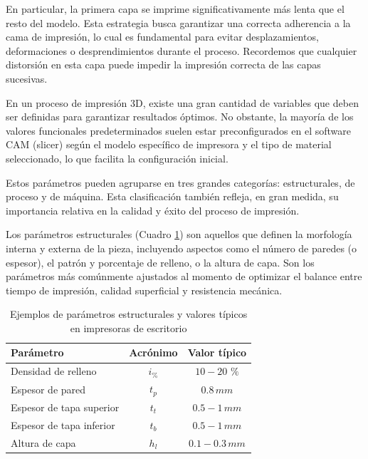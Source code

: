 En particular, la primera capa se imprime significativamente más lenta que el resto del modelo. Esta estrategia busca garantizar una correcta adherencia a la cama de impresión, lo cual es fundamental para evitar desplazamientos, deformaciones o desprendimientos durante el proceso. Recordemos que cualquier distorsión en esta capa puede impedir la impresión correcta de las capas sucesivas.

En un proceso de impresión 3D, existe una gran cantidad de variables que deben ser definidas para garantizar resultados óptimos. No obstante, la mayoría de los valores funcionales predeterminados suelen estar preconfigurados en el software CAM (slicer) según el modelo específico de impresora y el tipo de material seleccionado, lo que facilita la configuración inicial.

Estos parámetros pueden agruparse en tres grandes categorías: estructurales, de proceso y de máquina. Esta clasificación también refleja, en gran medida, su importancia relativa en la calidad y éxito del proceso de impresión. 

Los parámetros estructurales (Cuadro \ref{tab:param-estructurales}) son aquellos que definen la morfología interna y externa de la pieza, incluyendo aspectos como el número de paredes (o espesor), el patrón y porcentaje de relleno, o la altura de capa. Son los parámetros más comúnmente ajustados al momento de optimizar el balance entre tiempo de impresión, calidad superficial y resistencia mecánica.

\begin{table}[ht]
  \centering
  \caption{Ejemplos de parámetros estructurales y valores típicos en impresoras de escritorio}
  \label{tab:param-estructurales}
  \begin{tabular}{@{} l c c @{}}
    \toprule
    Parámetro                   & Acrónimo       & Valor típico     \\
    \midrule
    Densidad de relleno        & $i_{\%}$     &     $\mathrm{10-20}$ $\%$\\
    Espesor de pared            & $t_{p}$        &   $\mathrm{0.8}\,mm$  \\
    Espesor de tapa superior          & $t_{t}$ & $\mathrm{0.5-1}\,mm$\\
    Espesor de tapa inferior            & $t_{b}$ & $\mathrm{0.5-1}\, mm$\\
    Altura de capa           & $h_{l}$            &  $\mathrm{0.1-0.3}\, mm$    \\
    \bottomrule
  \end{tabular}
\end{table}

